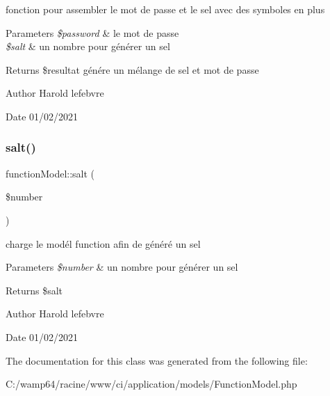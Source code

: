fonction pour assembler le mot de passe et le sel avec des symboles en plus 


\begin{DoxyParams}{Parameters}
{\em \$password} & le mot de passe \\
\hline
{\em \$salt} & un nombre pour générer un sel \\
\hline
\end{DoxyParams}
\begin{DoxyReturn}{Returns}
\$resultat génére un mélange de sel et mot de passe 
\end{DoxyReturn}
\begin{DoxyAuthor}{Author}
Harold lefebvre 
\end{DoxyAuthor}
\begin{DoxyDate}{Date}
01/02/2021 
\end{DoxyDate}
\mbox{\label{classfunction_model_acaffc7bb3def690818abb853e74d0e0a}} 
\subsubsection{\texorpdfstring{salt()}{salt()}}
{\footnotesize\ttfamily function\+Model\+::salt (\begin{DoxyParamCaption}\item[{}]{\$number }\end{DoxyParamCaption})}



charge le modél function afin de généré un sel 


\begin{DoxyParams}{Parameters}
{\em \$number} & un nombre pour générer un sel \\
\hline
\end{DoxyParams}
\begin{DoxyReturn}{Returns}
\$salt 
\end{DoxyReturn}
\begin{DoxyAuthor}{Author}
Harold lefebvre 
\end{DoxyAuthor}
\begin{DoxyDate}{Date}
01/02/2021 
\end{DoxyDate}


The documentation for this class was generated from the following file\+:\begin{DoxyCompactItemize}
\item 
C\+:/wamp64/racine/www/ci/application/models/Function\+Model.\+php\end{DoxyCompactItemize}
